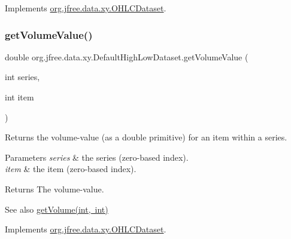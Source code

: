 Implements \mbox{\hyperlink{interfaceorg_1_1jfree_1_1data_1_1xy_1_1_o_h_l_c_dataset_a05012f783f010c1a62873a0c40e7b7fa}{org.\+jfree.\+data.\+xy.\+O\+H\+L\+C\+Dataset}}.

\mbox{\label{classorg_1_1jfree_1_1data_1_1xy_1_1_default_high_low_dataset_af97ca5089ee14cddbd768a78af00a501}} 
\subsubsection{\texorpdfstring{get\+Volume\+Value()}{getVolumeValue()}}
{\footnotesize\ttfamily double org.\+jfree.\+data.\+xy.\+Default\+High\+Low\+Dataset.\+get\+Volume\+Value (\begin{DoxyParamCaption}\item[{int}]{series,  }\item[{int}]{item }\end{DoxyParamCaption})}

Returns the volume-\/value (as a double primitive) for an item within a series.


\begin{DoxyParams}{Parameters}
{\em series} & the series (zero-\/based index). \\
\hline
{\em item} & the item (zero-\/based index).\\
\hline
\end{DoxyParams}
\begin{DoxyReturn}{Returns}
The volume-\/value.
\end{DoxyReturn}
\begin{DoxySeeAlso}{See also}
\mbox{\hyperlink{classorg_1_1jfree_1_1data_1_1xy_1_1_default_high_low_dataset_a36d4aedaf6e8a20597f5127434bc0562}{get\+Volume(int, int)}} 
\end{DoxySeeAlso}


Implements \mbox{\hyperlink{interfaceorg_1_1jfree_1_1data_1_1xy_1_1_o_h_l_c_dataset_a132a37218de3b54bf308b3dcfb93cf84}{org.\+jfree.\+data.\+xy.\+O\+H\+L\+C\+Dataset}}.

\mbox{\label{classorg_1_1jfree_1_1data_1_1xy_1_1_default_high_low_dataset_aa55b6574aaf34207a1a53e6bd8e422ea}} 
